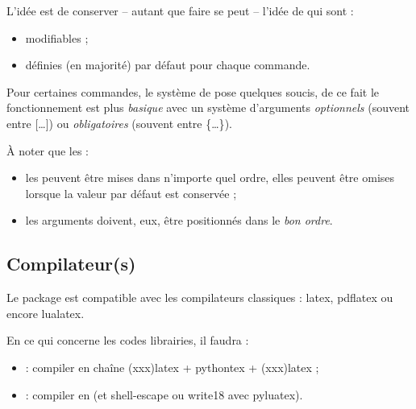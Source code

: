 \begin{tipblock}
L'idée est de conserver -- autant que faire se peut -- l'idée de  qui sont :
%
\begin{itemize}
	\item modifiables ;
	\item définies (en majorité) par défaut pour chaque commande.
\end{itemize}

Pour certaines commandes, le système de  pose quelques soucis, de ce fait le fonctionnement est plus \textit{basique} avec un système d'\textsf{arguments} \textit{optionnels} (souvent entre \textsf{[\ldots]}) ou \textit{obligatoires} (souvent entre \textsf{\{\ldots\}}).

\smallskip

À noter que les :
%
\begin{itemize}
	\item les  peuvent être mises dans n'importe quel ordre, elles peuvent être omises lorsque la valeur par défaut est conservée ;
	\item les \textsf{arguments} doivent, eux, être positionnés dans le \textit{bon ordre}.
\end{itemize}
\vspace*{-\baselineskip}\leavevmode
\end{tipblock}

\subsection{Compilateur(s)}

\begin{noteblock}
Le package  est compatible avec les compilateurs classiques : \textsf{latex}, \textsf{pdflatex} ou encore \textsf{lualatex}.

\smallskip

En ce qui concerne les codes \textsf{librairies}, il faudra :

\begin{itemize}
	\item {} : compiler en chaîne \textsf{(xxx)latex + pythontex + (xxx)latex} ;
	\item {} : compiler en  (et \textsf{shell-escape} ou \textsf{write18} avec \textsf{pyluatex}).
\end{itemize}
\vspace*{-\baselineskip}\leavevmode
\end{noteblock}

